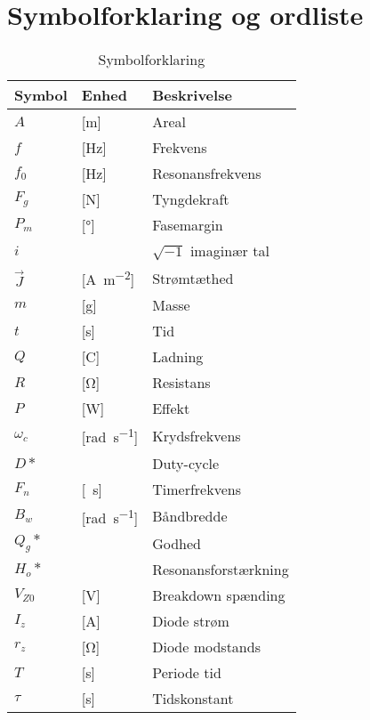 
\section{Symbolforklaring og ordliste} \label{bilag:symbol}




\begin{table}[h!]
\centering
\caption{Symbolforklaring}
\label{tab:symboler}
\begin{threeparttable}
\begin{tabular}{l l l}
\toprule
\multicolumn{1}{l}{Symbol}       &
\multicolumn{1}{l}{Enhed}        &
\multicolumn{1}{l}{Beskrivelse}  \\ 
\midrule
$A$					&	[\si{\meter}]				& Areal 		\\
$f$					&	[\si{\hertz}]				& Frekvens		\\
$f_0$				&	[\si{\hertz}] 				& Resonansfrekvens \\
$F_g$				&	[\si{\newton}]				& Tyngdekraft	\\
$P_{m}$				&	[\si{\degree}]				& Fasemargin	\\
$i$\tnote{*}		&								& $\sqrt{-1}$ imaginær tal	\\
$\vec{J}$			&	[\si{\ampere\per\meter\squared}]		& Strømtæthed	\\
$m$			  		&	[\si{\gram}] 				& Masse \\
$t$			  		&	[\si{\second}] 				& Tid \\
$Q$					&	[\si{\coulomb}] 			& Ladning \\
$R$					&	[\si{\ohm}] 				& Resistans \\
$P$					&	[\si{\watt}] 				& Effekt \\
$\omega_{c}$		&	[\si{\radian\per\second}]	& Krydsfrekvens	\\
$D*$				&								& Duty-cycle\\
$F_n$				&	[\si{\per\second}]			& Timerfrekvens\\
$B_w$				&	[\si{\radian\per\second}]	& Båndbredde\\
$Q_g*$				&								& Godhed\\
$H_o*$				&								& Resonansforstærkning\\
$V_{Z0}$			&	[\si{\volt}]				& Breakdown spænding\\
$I_z$				&	[\si{\ampere}]				& Diode strøm\\
$r_z$				&	[\si{\ohm}]					& Diode modstands\\
$T$					&	[\si{\second}]				& Periode tid\\
$\tau$				&	[\si{\second}]				& Tidskonstant\\

\end{tabular}
\end{threeparttable}
\end{table}
